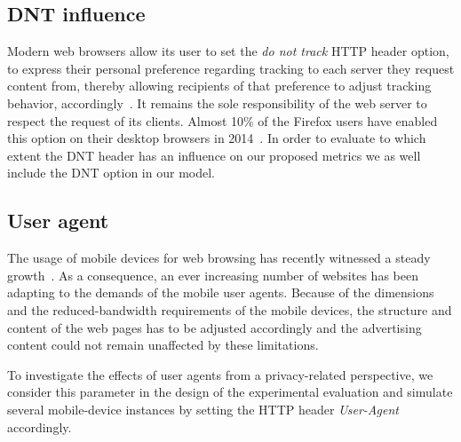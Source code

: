\subsection{DNT influence}
Modern web browsers allow its user to set the \emph{do not track} HTTP header option, to express their personal preference regarding tracking to each server they request content from, thereby allowing recipients of that preference to adjust tracking behavior, accordingly~\cite{dnt}. It remains the sole responsibility of the web server to respect the request of its clients. Almost 10\% of the Firefox users have enabled this option on their desktop browsers in 2014~\cite{dnt_state_firefox}. In order to evaluate to which extent the DNT header has an influence on our proposed metrics we as well include the DNT option in our model.

\subsection{User agent}
The usage of mobile devices for web browsing has recently witnessed a steady growth~\cite{mobile_usage}. As a consequence, an ever increasing number of websites has been adapting to the demands of the mobile user agents. Because of the dimensions and the reduced-bandwidth requirements of the mobile devices, the structure and content of the web pages has to be adjusted accordingly and the advertising content could not remain unaffected by these limitations.

To investigate the effects of user agents from a privacy-related perspective, we consider this parameter in the design of the experimental evaluation and simulate several mobile-device instances by setting the HTTP header \textit{User-Agent} accordingly.